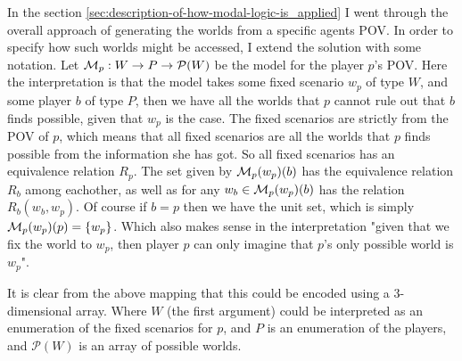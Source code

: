In the section \ref{sec:description-of-how-modal-logic-is_applied} I went through the overall approach of generating the worlds from a specific agents POV. In order to specify how such worlds might be accessed, I extend the solution with some notation. Let $\mathcal{M}_p: W \rightarrow P \rightarrow \mathcal{P}(W)$ be the model for the player $p$'s POV. Here the interpretation is that the model takes some fixed scenario $w_p$ of type $W$, and some player $b$ of type $P$, then we have all the worlds that $p$ cannot rule out that $b$ finds possible, given that $w_p$ is the case.  
The fixed scenarios are strictly from the POV of $p$, which means that all fixed scenarios are all the worlds that $p$ finds possible from the information she has got. So all fixed scenarios has an equivalence relation $R_p$. The set given by $\mathcal{M}_p(w_p)(b)$ has the equivalence relation $R_b$ among eachother, as well as for any $w_b \in \mathcal{M}_p(w_p)(b)$ has the relation $R_b(w_b,w_p)$. Of course if $b=p$ then we have the unit set, which is simply $\mathcal{M}_p(w_p)(p) = \{w_p\}$. Which also makes sense in the interpretation "given that we fix the world to $w_p$, then player $p$ can only imagine that $p$'s only possible world is $w_p$". 

It is clear from the above mapping that this could be encoded using a 3-dimensional array. Where $W$ (the first argument) could be interpreted as an enumeration of the fixed scenarios for $p$, and $P$ is an enumeration of the players, and $\mathcal{P}(W)$ is an array of possible worlds.




